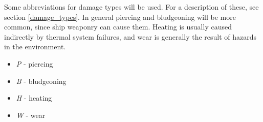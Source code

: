 \documentclass[a4paper]{article}
\begin{document}
\vspace{0.2cm} \hspace{-18pt} Some abbreviations for damage types will be used. For a description of these, see section \ref{damage_types}. In general piercing and bludgeoning will be more common, since ship weaponry can cause them. Heating is usually caused indirectly by thermal system failures, and wear is generally the result of hazards in the environment.
\begin{itemize}
\item \textit{P} - piercing
\item \textit{B} - bludgeoning
\item \textit{H} - heating
\item \textit{W} - wear
\end{itemize}

\def\qtwo#1#2#3{1d2 ? 
\vspace*{-0.4cm} 
\begin{enumerate}[leftmargin=1.8cm]
\item [1.] #1 
\item [2.] #2 
\end{enumerate}\\}
\def\qthree#1#2#3{1d3 ? 
\vspace*{-0.4cm} \begin{enumerate}[leftmargin=1.8cm]
\item [1.] #1 
\item [2.] #2 
\item [3.] #3 
\end{enumerate}\\}
\def\qfour#1#2#3#4{1d4 ? 
\vspace*{-0.4cm} \begin{enumerate}[leftmargin=1.8cm]
\item [1.] #1 
\item [2.] #2 
\item [3.] #3 
\item [4.] #4 
\end{enumerate}\\}
\end{document}
